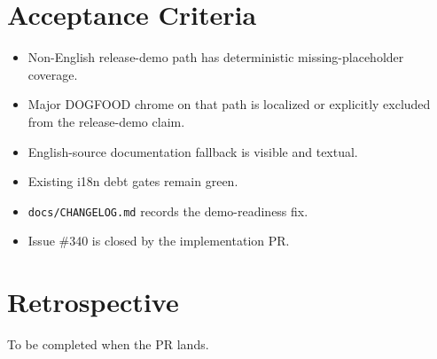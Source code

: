 \section{Acceptance Criteria}\label{record-196-acceptance-criteria}

\begin{itemize}
\tightlist
\item
  Non-English release-demo path has deterministic missing-placeholder coverage.
\item
  Major DOGFOOD chrome on that path is localized or explicitly excluded from the release-demo claim.
\item
  English-source documentation fallback is visible and textual.
\item
  Existing i18n debt gates remain green.
\item
  \texttt{d\allowbreak{}o\allowbreak{}c\allowbreak{}s\allowbreak{}/\allowbreak{}C\allowbreak{}H\allowbreak{}A\allowbreak{}N\allowbreak{}G\allowbreak{}E\allowbreak{}L\allowbreak{}O\allowbreak{}G\allowbreak{}.\allowbreak{}m\allowbreak{}d} records the demo-readiness fix.
\item
  Issue \#340 is closed by the implementation PR.
\end{itemize}

\section{Retrospective}\label{record-196-retrospective}

To be completed when the PR lands.

